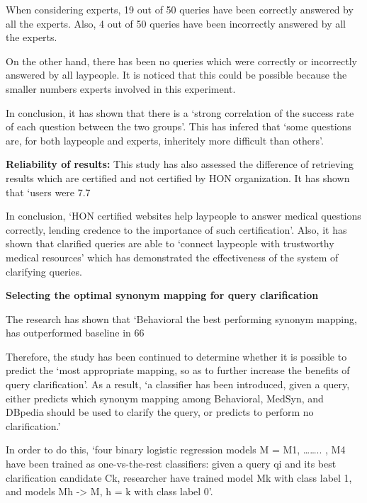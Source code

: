 \documentclass[]{article}
\begin{document}
When considering experts, 19 out of 50 queries have been correctly answered by all the experts. Also, 4 out of 50 queries have been incorrectly answered by all the experts.

On the other hand, there has been no queries which were correctly or incorrectly answered by all laypeople. It is noticed that this could be possible because the smaller numbers experts involved in this experiment. 
  
In conclusion, it has shown that there is a  ‘strong correlation of the success rate of each question between the two groups’. This has infered that ‘some questions are, for both laypeople and experts, inheritely more difficult than others’.

\textbf{Reliability of results:} This study has also assessed the difference of retrieving results which are certified and not certified by HON organization. It has shown that ‘users were 7.7 %

In conclusion, ‘HON certified websites help laypeople to answer medical questions correctly, lending credence to the importance of such certification’. Also, it has shown that clarified queries are able to ‘connect laypeople with trustworthy medical resources’ which has demonstrated the effectiveness of the system of clarifying queries.    

\textbf{Selecting the optimal synonym mapping for query clarification}

The research has shown that ‘Behavioral the best performing synonym mapping, has outperformed baseline in 66%

Therefore, the study has been continued to determine whether it is possible to predict the ‘most appropriate mapping, so as to further increase the benefits of query clarification’. As a result, ‘a classifier has been introduced, given a query, either predicts which synonym mapping among Behavioral, MedSyn, and DBpedia should be used to clarify the query, or predicts to perform no clarification.’ 

In order to do this, ‘four binary logistic regression models M = {M1, …….. , M4} have been trained as one-vs-the-rest classifiers: given a query qi and its best clarification candidate Ck, researcher have trained model Mk with class label 1, and models Mh -> M, h = k with class label 0’.  
\end{document}
